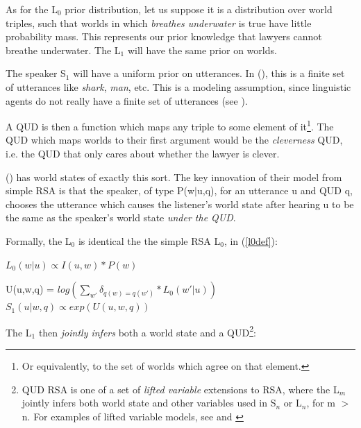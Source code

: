 \documentclass[10pt,letterpaper,twocolumn]{article}
\begin{document}
As for the L$_0$ prior distribution, let us suppose it is a distribution over world triples, such that worlds in which \emph{breathes underwater} is true have little probability mass. This represents our prior knowledge that lawyers cannot breathe underwater. The L$_1$ will have the same prior on worlds.

The speaker S$_1$ will have a uniform prior on utterances. In (\cite{kao}), this is a finite set of utterances like \emph{shark}, \emph{man}, etc. This is a modeling assumption, since linguistic agents do not really have a finite set of utterances (see \cite{chomsky2002syntactic}).

A QUD is then a function which maps any triple to some element of it\footnote{Or equivalently, to the set of worlds which agree on that element.}. The QUD which maps worlds to their first argument would be the \emph{cleverness} QUD, i.e. the QUD that only cares about whether the lawyer is clever.

(\cite{kao}) has world states of exactly this sort. The key innovation of their model from simple RSA is that the speaker, of type P(w$\vert$u,q), for an utterance u and QUD q, chooses the utterance which causes the listener's world state after hearing u to be the same as the speaker's world state \emph{under the QUD}. 

Formally, the L$_0$ is identical the the simple RSA L$_0$, in (\ref{l0def}):

\begin{exe}
\ex  $L_0(w\vert u) \propto  I(u,w)*P(w)$
\end{exe}

\begin{exe}
\ex U(u,w,q) = $log(\sum_{w'} \delta_{q(w)=q(w')} * L_0(w'\vert u))$
\ex $S_1(u\vert w,q) \propto exp(U(u,w,q))$
\end{exe}

The L$_1$ then \emph{jointly infers} both a world state and a QUD\footnote{QUD RSA is one of a set of \emph{lifted variable} extensions to RSA, where the L$_m$ jointly infers both world state and other variables used in S$_n$ or L$_n$, for m $>$n. For examples of lifted variable models, see \cite{kao} and \cite{bergen}}:
\end{document}
